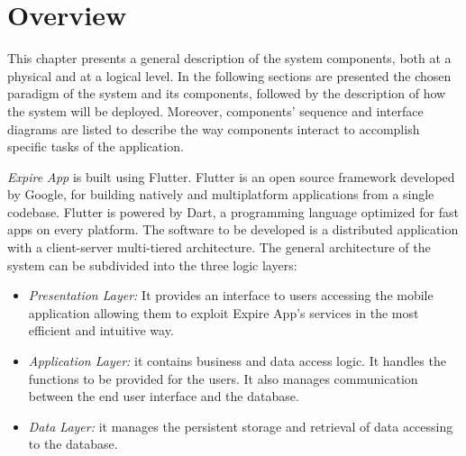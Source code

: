 \section{Overview}
This chapter presents a general description of the system components, both at a physical and at a logical level. In the following sections are presented the chosen paradigm of the system and its components, followed by the description of how the system will be deployed. Moreover, components’ sequence and interface diagrams are listed to describe the way components interact to accomplish specific tasks of the application.

\textit{Expire App }is built using Flutter.
Flutter is an open source framework developed by Google, for building natively and multiplatform applications from a single codebase.
Flutter is powered by Dart, a programming language optimized for fast apps on every platform.
The software to be developed is a distributed application with a client-server multi-tiered architecture.
The general architecture of the system can be subdivided into the three logic layers:
\begin{itemize}
    \item \textit{Presentation Layer: }It provides an interface to users accessing  the mobile application  allowing them to exploit Expire App’s services in the most efficient and intuitive way.
    \item \textit{Application Layer: } it contains business and data access logic. It handles the functions to be provided for the users. It also manages communication between the end user interface and the database.
    \item \textit{Data Layer: }it manages the persistent storage and retrieval of data accessing to the database.
\end{itemize}